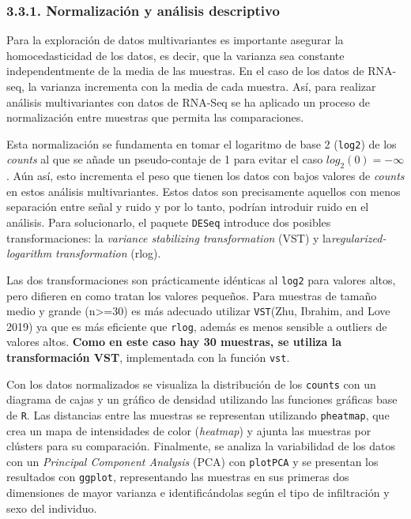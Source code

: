 \documentclass[
]{article}
\begin{document}
\hypertarget{normalizaciuxf3n-y-anuxe1lisis-descriptivo}{%
\subsubsection{3.3.1. Normalización y análisis
descriptivo}\label{normalizaciuxf3n-y-anuxe1lisis-descriptivo}}

Para la exploración de datos multivariantes es importante asegurar la
homocedasticidad de los datos, es decir, que la varianza sea constante
independentmente de la media de las muestras. En el caso de los datos de
RNA-seq, la varianza incrementa con la media de cada muestra. Así, para
realizar análisis multivariantes con datos de RNA-Seq se ha aplicado un
proceso de normalización entre muestras que permita las comparaciones.

Esta normalización se fundamenta en tomar el logaritmo de base 2
(\texttt{log2}) de los \emph{counts} al que se añade un pseudo-contaje
de 1 para evitar el caso \(log_2(0)=-\infty\). Aún así, esto incrementa
el peso que tienen los datos con bajos valores de \emph{counts} en estos
análisis multivariantes. Estos datos son precisamente aquellos con menos
separación entre señal y ruido y por lo tanto, podrían introduir ruido
en el análisis. Para solucionarlo, el paquete \texttt{DESeq} introduce
dos posibles transformaciones: la \emph{variance stabilizing
transformation} (VST) y la\emph{regularized-logarithm transformation}
(rlog).

Las dos transformaciones son prácticamente idénticas al \texttt{log2}
para valores altos, pero difieren en como tratan los valores pequeños.
Para muestras de tamaño medio y grande (n\textgreater=30) es más
adecuado utilizar \texttt{VST}(Zhu, Ibrahim, and Love 2019) ya que es
más eficiente que \texttt{rlog}, además es menos sensible a outliers de
valores altos. \textbf{Como en este caso hay 30 muestras, se utiliza la
transformación VST}, implementada con la función \texttt{vst}.

Con los datos normalizados se visualiza la distribución de los
\texttt{counts} con un diagrama de cajas y un gráfico de densidad
utilizando las funciones gráficas base de \texttt{R}. Las distancias
entre las muestras se representan utilizando \texttt{pheatmap}, que crea
un mapa de intensidades de color (\emph{heatmap}) y ajunta las muestras
por clústers para su comparación. Finalmente, se analiza la variabilidad
de los datos con un \emph{Principal Component Analysis} (PCA) con
\texttt{plotPCA} y se presentan los resultados con \texttt{ggplot},
representando las muestras en sus primeras dos dimensiones de mayor
varianza e identificándolas según el tipo de infiltración y sexo del
individuo.
\end{document}
